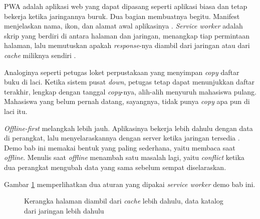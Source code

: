 PWA adalah aplikasi web yang dapat dipasang seperti aplikasi biasa dan tetap
bekerja ketika jaringannya buruk. Dua bagian membuatnya begitu. Manifest
menjelaskan nama, ikon, dan alamat awal aplikasinya \cite{w3c-appmanifest}.
\textit{Service worker} adalah skrip yang berdiri di antara halaman dan
jaringan, menangkap tiap permintaan halaman, lalu memutuskan apakah
\textit{response}-nya diambil dari jaringan atau dari \textit{cache} miliknya
sendiri
\cite{w3c-service-workers}.

Analoginya seperti petugas loket perpustakaan yang menyimpan \textit{copy} daftar
buku di laci. Ketika sistem pusat \textit{down}, petugas tetap dapat menunjukkan daftar
terakhir, lengkap dengan tanggal \textit{copy}-nya, alih-alih menyuruh mahasiswa
pulang. Mahasiswa yang belum pernah datang, sayangnya, tidak punya \textit{copy}
apa pun di laci itu.

\textit{Offline-first} melangkah lebih jauh. Aplikasinya bekerja lebih dahulu
dengan data di perangkat, lalu menyelaraskannya dengan server ketika jaringan
tersedia \cite{kleppmann2019localfirst}. Demo bab ini memakai bentuk yang
paling sederhana, yaitu membaca saat \textit{offline}. Menulis saat
\textit{offline} menambah satu masalah lagi, yaitu \textit{conflict} ketika
dua perangkat mengubah data yang sama sebelum sempat diselaraskan.

Gambar \ref{fig:sw14} memperlihatkan dua aturan yang dipakai \textit{service
worker} demo bab ini.

\begin{figure}[!htb]
  \centering
  \caption{Kerangka halaman diambil dari \textit{cache} lebih dahulu, data
           katalog dari jaringan lebih dahulu}
  \label{fig:sw14}
\end{figure}


